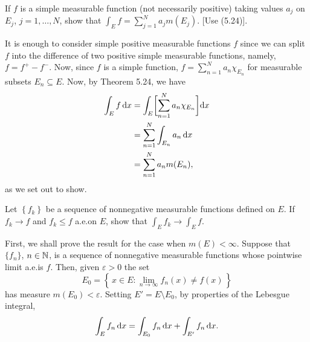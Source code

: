 \begin{problem}
  If $f$ is a simple measurable function (not necessarily positive) taking
  values $a_j$ on $E_j$, $j=1,\ldots,N$, show that
  $\int_E f=\sum_{j=1}^N a_jm(E_j)$. [Use (5.24)].
\end{problem}
\begin{solution}
  It is enough to consider simple positive measurable functions $f$ since
  we can split $f$ into the difference of two positive simple measurable
  functions, namely, $f=f^+-f^-$. Now, since $f$ is a simple function,
  $f=\sum_{n=1}^Na_n\chi_{E_n}$ for measurable subsets $E_n\subseteq
  E$. Now, by Theorem 5.24, we have
  \begin{align*}
    \int_E f\mathop{}\!\mathrm{d} x
    &=\int_E\biggl[ \sum_{n=1}^N a_n\chi_{E_n} \biggr]\mathrm{d} x\\
    &=\sum_{n=1}^N \int_{E_n} a_n\mathop{}\!\mathrm{d} x\\
    &=\sum_{n=1}^N a_n m(E_n),
  \end{align*}
  as we set out to show.
\end{solution}

\begin{problem}
  Let $\left\{f_k\right\}$ be a sequence of nonnegative measurable
  functions defined on $E$. If $f_k\to f$ and $f_k\leq f$ a.e.\@ on $E$,
  show that $\int_E f_k\to\int_E f$.
\end{problem}
\begin{solution}
  First, we shall prove the result for the case when $m(E)<\infty$. Suppose
  that $\{f_n\}$, $n\in\mathbb{N}$, is a sequence of nonnegative measurable
  functions whose pointwise limit a.e.\@ is $f$. Then, given
  $\varepsilon>0$ the set
  \[
    E_0=\left\{\,x\in E:\lim_{n\to\infty}f_n(x)\neq f(x)\,\right\}
  \]
  has measure $m(E_0)<\varepsilon$. Setting $E'=E\setminus E_0$, by
  properties of the Lebesgue integral,
  \[
    \int_E f_n\mathop{}\!\mathrm{d} x=\int_{E_0} f_n\mathop{}\!\mathrm{d} x+\int_{E'} f_n\mathop{}\!\mathrm{d} x.
  \]
\end{solution}

